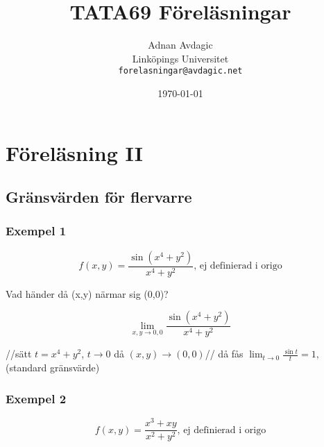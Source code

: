 \documentclass{article}
\title{TATA69 Föreläsningar}
\author{Adnan Avdagic\\
	Linköpings Universitet\\
	\texttt{forelasningar@avdagic.net}}
\date{\today}
\begin{document}
\hypersetup{pageanchor=false}
\begin{titlepage}
\maketitle
{}
\thispagestyle{empty}
\end{titlepage}


\cleardoublepage
{}
\tableofcontents
\cleardoublepage
{}




\newpage
\hypersetup{pageanchor=true}
\cleardoublepage
\setcounter{page}{1}
\setcounter{section}{1}
\pagestyle{fancy}
\fancyhf{}
\rfoot{\rightmark}
\noindent
\section{Föreläsning II}
\subsection{Gränsvärden för flervarre}

\subsubsection{Exempel 1} \flushleft
\begin{equation} \label{eq:2.1}
	f(x,y) = \frac{\sin(x^4+y^2)}{x^4+y^2} \text{, ej definierad i origo}
\end{equation}

Vad händer då (x,y) närmar sig (0,0)?

$$\lim_{x,y \rightarrow 0,0} \frac{\sin(x^4+y^2)}{x^4+y^2}$$

//sätt $t= \displaystyle x^4+y^2$, ${t \rightarrow 0}$ då ${(x,y) \rightarrow (0,0)}$// \newline
då fås \(\displaystyle \lim_{t \rightarrow 0} \frac{\sin t}{t} = 1,\) (standard gränsvärde) \newline

\subsubsection{Exempel 2} \flushleft
\begin{equation} \label{eq:2.2}
	f(x,y) = \frac{x^3+xy}{x^2+y^2} \text{, ej definierad i origo}
\end{equation}
\end{document}
